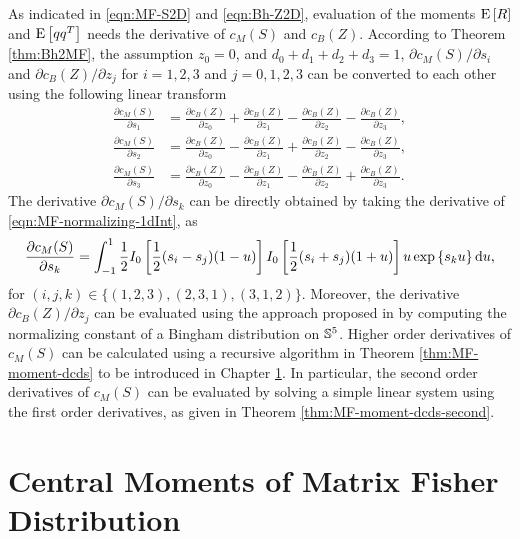 As indicated in \eqref{eqn:MF-S2D} and \eqref{eqn:Bh-Z2D}, evaluation of the moments $\mathrm{E}\left[ R \right]$ and $\mathrm{E}\left[ qq^T \right]$ needs the derivative of $c_M(S)$ and $c_B(Z)$.
According to Theorem \ref{thm:Bh2MF}, the assumption $z_0 = 0$, and $d_0+d_1+d_2+d_3 = 1$, $\partial c_M(S)/\partial s_i$ and $\partial c_B(Z)/\partial z_j$ for $i=1,2,3$ and $j=0,1,2,3$ can be converted to each other using the following linear transform
\begin{subequations}
	\begin{align}
		\frac{\partial c_M(S)}{\partial s_1} &= \frac{\partial c_B(Z)}{\partial z_0} + \frac{\partial c_B(Z)}{\partial z_1} - \frac{\partial c_B(Z)}{\partial z_2} - \frac{\partial c_B(Z)}{\partial z_3}, \\
		\frac{\partial c_M(S)}{\partial s_2} &= \frac{\partial c_B(Z)}{\partial z_0} - \frac{\partial c_B(Z)}{\partial z_1} + \frac{\partial c_B(Z)}{\partial z_2} - \frac{\partial c_B(Z)}{\partial z_3}, \\
		\frac{\partial c_M(S)}{\partial s_3} &= \frac{\partial c_B(Z)}{\partial z_0} - \frac{\partial c_B(Z)}{\partial z_1} - \frac{\partial c_B(Z)}{\partial z_2} + \frac{\partial c_B(Z)}{\partial z_3}.
	\end{align}
\end{subequations}
The derivative $\partial c_M(S)/\partial s_k$ can be directly obtained by taking the derivative of \eqref{eqn:MF-normalizing-1dInt}, as
\begin{align} \label{eqn:MF-S2D-1dint}
	\frac{\partial c_M(S)}{\partial s_k} = \int_{-1}^1 \frac{1}{2} I_0\left[ \frac{1}{2}(s_i-s_j)(1-u) \right] I_0\left[ \frac{1}{2}(s_i+s_j)(1+u) \right] u\exp\left\{ s_ku \right\} \mathrm{d} u,
\end{align}
for $(i,j,k) \in \{(1,2,3),(2,3,1),(3,1,2)\}$.
Moreover, the derivative $\partial c_B(Z)/\partial z_j$ can be evaluated using the approach proposed in \cite{kume2007derivatives} by computing the normalizing constant of a Bingham distribution on $\mathbb{S}^5$.
Higher order derivatives of $c_M(S)$ can be calculated using a recursive algorithm in Theorem \ref{thm:MF-moment-dcds} to be introduced in Chapter \ref{section:MF-moments}.
In particular, the second order derivatives of $c_M(S)$ can be evaluated by solving a simple linear system using the first order derivatives, as given in Theorem \ref{thm:MF-moment-dcds-second}.

\section{Central Moments of Matrix Fisher Distribution} \label{section:MF-moments}

